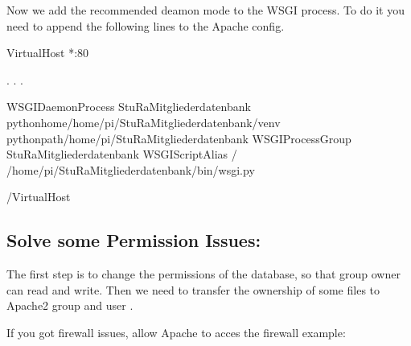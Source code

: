 \documentclass[letterpaper,10pt,english]{sphinxmanual}
\begin{document}
Now we add the recommended deamon mode to the WSGI process.
To do it you need to append the following lines to the Apache config.
\def\sphinxLiteralBlockLabel{\label{\detokenize{masterAdminDoc:id2}}}
\begin{sphinxVerbatim}[commandchars=\\\{\}]
\PYGZlt{}VirtualHost *:80\PYGZgt{}

  . . .

  WSGIDaemonProcess StuRa\PYGZhy{}Mitgliederdatenbank python\PYGZhy{}home/home/pi/StuRa\PYGZhy{}Mitgliederdatenbank/venv python\PYGZhy{}path/home/pi/StuRa\PYGZhy{}Mitgliederdatenbank
  WSGIProcessGroup StuRa\PYGZhy{}Mitgliederdatenbank
  WSGIScriptAlias / /home/pi/StuRa\PYGZhy{}Mitgliederdatenbank/bin/wsgi.py

\PYGZlt{}/VirtualHost\PYGZgt{}
\end{sphinxVerbatim}


\subsection{Solve some Permission Issues:}
\label{\detokenize{masterAdminDoc:solve-some-permission-issues}}
The first step is to change the permissions of the database, so that group owner
can read and write. Then we need to transfer the ownership of some files to Apache2
group and user .
\begin{quote}

\begin{DUlineblock}{0em}
\item[] 
\item[] 
\item[] 
\end{DUlineblock}
\end{quote}

If you got firewall issues, allow Apache to acces the firewall example:
\begin{quote}

\end{quote}
\end{document}
